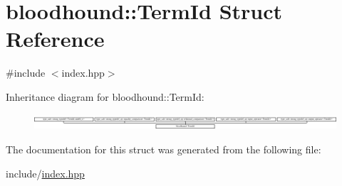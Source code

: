 \hypertarget{structbloodhound_1_1TermId}{}\section{bloodhound\+:\+:Term\+Id Struct Reference}
\label{structbloodhound_1_1TermId}


{\ttfamily \#include $<$index.\+hpp$>$}

Inheritance diagram for bloodhound\+:\+:Term\+Id\+:\begin{figure}[H]
\begin{center}
\leavevmode
\includegraphics[height=0.592593cm]{structbloodhound_1_1TermId}
\end{center}
\end{figure}


The documentation for this struct was generated from the following file\+:\begin{DoxyCompactItemize}
\item 
include/\mbox{\hyperlink{index_8hpp}{index.\+hpp}}\end{DoxyCompactItemize}
